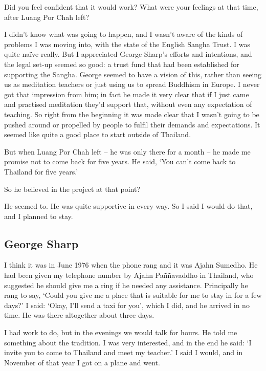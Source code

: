 \question{}
Did you feel confident that it would work? What were your
feelings at that time, after Luang Por Chah left? 

\answer{}
I didn't know what was going to happen, and I wasn't aware of the
kinds of problems I was moving into, with the state of the English
Sangha Trust. I was quite naïve really. But I appreciated George Sharp's
efforts and intentions, and the legal set-up seemed so good: a trust
fund that had been established for supporting the Sangha. George seemed
to have a vision of this, rather than seeing us as meditation teachers
or just using us to spread Buddhism in Europe. I never got that
impression from him; in fact he made it very clear that if I just came
and practised meditation they'd support that, without even any
expectation of teaching. So right from the beginning it was made clear
that I wasn't going to be pushed around or propelled by people to fulfil
their demands and expectations. It seemed like quite a good place to
start outside of Thailand.

But when Luang Por Chah left -- he was only there for a month -- he made
me promise not to come back for five years. He said, `You can't come
back to Thailand for five years.'

\question{}
So he believed in the project at that point?

\answer{}
He seemed to. He was quite supportive in every way. So I said
I would do that, and I planned to stay.

\subsection{George Sharp}

I think it was in June 1976 when the phone rang and it was Ajahn
Sumedho. He had been given my telephone number by Ajahn Paññavaddho in
Thailand, who suggested he should give me a ring if he needed any
assistance. Principally he rang to say, `Could you give me a place that
is suitable for me to stay in for a few days?' I said: `Okay, I'll send
a taxi for you', which I did, and he arrived in no time. He was there
altogether about three days.

I had work to do, but in the evenings we would talk for hours. He told
me something about the tradition. I was very interested, and in the end
he said: `I invite you to come to Thailand and meet my teacher.' I said
I would, and in November of that year I got on a plane and went. 

